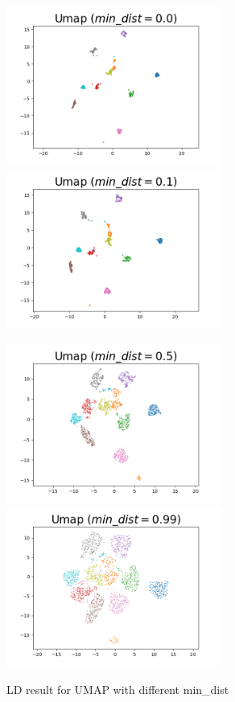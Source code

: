 \begin{figure}[H]
\centering  %
{
\label{Fig.sub.1}
\includegraphics[width=7cm,height=4cm\textwidth]{images/umap/umap_min_dist_0.0.png}}
{
\label{Fig.sub.2}
\includegraphics[width=7cm,height=4cm\textwidth]{images/umap/umap_min_dist_0.1.png}}

\centering  %
{
\label{Fig.sub.1}
\includegraphics[width=7cm,height=4cm\textwidth]{images/umap/umap_min_dist_0.5.png}}
{
\label{Fig.sub.2}
\includegraphics[width=7cm,height=4cm\textwidth]{images/umap/umap_min_dist_0.99.png}}
\caption{LD result for UMAP with different min\_dist}
\end{figure}

